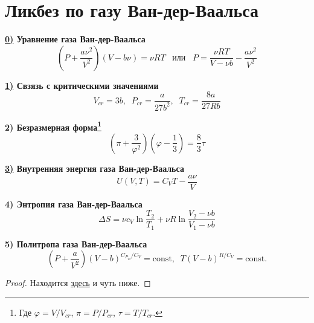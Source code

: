 \section{Ликбез по газу Ван-дер-Ваальса}

\noindent
\textbf{\hyperref[new_V]{0)} Уравнение газа Ван-дер-Ваальса}
\begin{equation}
\label{vdv}
    \left(  
    P + \frac{a \nu^2}{V^2}
    \right)
    \left(  
    V - b \nu
    \right) = \nu R T \; \; \; \text{или} \; \; \; 
    P = \frac{\nu R T}{V - \nu b} - \frac{a \nu^2}{V^2}
\end{equation}

\noindent
\textbf{\hyperref[cr_dot]{1)} Свзязь с критическими значениями}
\begin{equation}
\label{cr_p}
    V_{cr} = 3b, \; \; P_{cr} = \dfrac{a}{27b^2}, \; \; T_{cr} = \frac{8a}{27Rb}
\end{equation}

\noindent
\textbf{2) Безразмерная форма\footnote{
Где $\varphi = V/V_{cr}$, $\pi = P / P_{cr}$, $\tau = T / T_{cr}$.
}}
\begin{equation}
    \left(\pi+\frac{3}{\varphi^2} \right) \left( \varphi - \frac{1}{3} \right) 
    = 
    \frac{8}{3} \tau
\end{equation}

\noindent
\textbf{\hyperref[docUvdv]{3)} Внутренняя энергия газа Ван-дер-Ваальса}
\begin{equation}
\label{uvdv}
    U(V, T) = C_V T - \frac{a \nu}{V}
\end{equation}

\noindent
\textbf{4) Энтропия газа Ван-дер-Ваальса}
\begin{equation}
    \Delta S = \nu c_V \ln \frac{T_2}{T_1} + \nu R \ln \frac{V_2 - \nu b}{V_1 - \nu b}
\end{equation}

\noindent
\textbf{5) Политропа газа Ван-дер-Ваальса}
\begin{equation}
    \left(P + \frac{a}{V^2}\right) \left( V - b \right)^{C_{P_{id}} / C_V} = \text{const}, \; \;
    T (V - b)^{R / C_V} = \text{const}.
\end{equation}

\begin{proof}
Находится \href{https://ru.wikipedia.org/wiki/%D0%A3%D1%80%D0%B0%D0%B2%D0%BD%D0%B5%D0%BD%D0%B8%D0%B5_%D0%92%D0%B0%D0%BD-%D0%B4%D0%B5%D1%80-%D0%92%D0%B0%D0%B0%D0%BB%D1%8C%D1%81%D0%B0}{здесь} и чуть ниже.
\end{proof}

